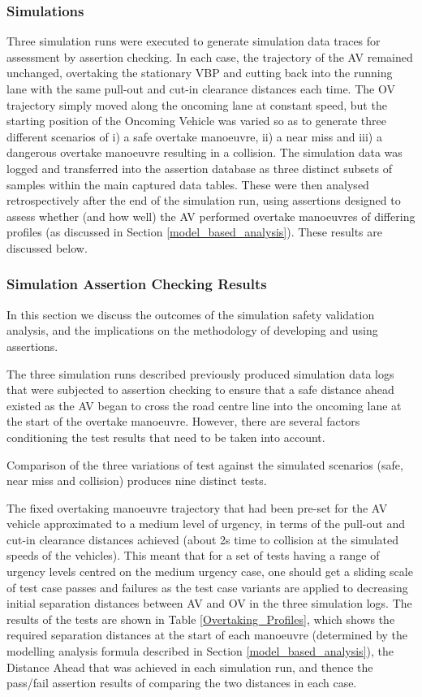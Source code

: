 \subsubsection{Simulations}

Three simulation runs were executed to generate simulation data traces for assessment by assertion checking. In each case, the trajectory of the AV remained unchanged, overtaking the stationary VBP and cutting back into the running lane with the same pull-out and cut-in clearance distances each time. The OV trajectory simply moved along the oncoming lane at constant speed, but the starting position of the Oncoming Vehicle was varied so as to generate three different scenarios of i) a safe overtake manoeuvre, ii) a near miss and iii) a dangerous overtake manoeuvre resulting in a collision. The simulation data was logged and transferred into the assertion database as three distinct subsets of samples within the main captured data tables. These were then analysed retrospectively after the end of the simulation run, using assertions designed to assess whether (and how well) the AV performed overtake manoeuvres of differing profiles (as discussed in Section \ref{model_based_analysis}). These results are discussed below.

\subsubsection{Simulation Assertion Checking 
Results} \label{sim_results}
In this section we discuss the outcomes of the simulation safety validation analysis, and the implications on the methodology of developing and using assertions.

The three simulation runs described previously produced simulation data logs that were subjected to assertion checking to ensure that a safe distance ahead existed as the AV began to cross the road centre line into the oncoming lane at the start of the overtake manoeuvre. However, there are several factors conditioning the test results that need to be taken into account.

Comparison of the three variations of test against the simulated scenarios (safe, near miss and collision) produces nine distinct tests. 

The fixed overtaking manoeuvre trajectory that had been pre-set for the AV vehicle approximated to a medium level of urgency, in terms of the pull-out and cut-in clearance distances achieved (about 2s time to collision at the simulated speeds of the vehicles). This meant that for a set of tests having a range of urgency levels centred on the medium urgency case, one should get a sliding scale of test case passes and failures as the test case variants are applied to decreasing initial separation distances between AV and OV in the three simulation logs. The results of the tests are shown in Table \ref{Overtaking_Profiles}, which shows the required separation distances at the start of each manoeuvre (determined by the modelling analysis formula described in Section \ref{model_based_analysis}), the Distance Ahead that was achieved in each simulation run, and thence the pass/fail assertion results of comparing the two distances in each case.

